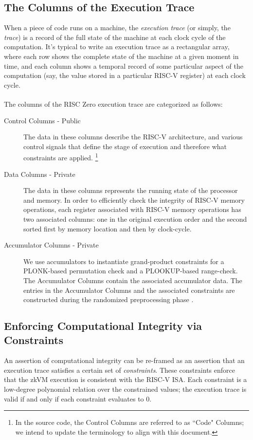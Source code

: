 \documentclass[10pt,letterpaper,titlepage]{article}
\theoremstyle{definition}
\begin{document}
\subsection{The Columns of the Execution Trace}
\label{trace}
When a piece of code runs on a machine, the \textit{execution trace} (or simply, the \textit{trace}) is a record of the full state of the machine at each clock cycle of the computation.
It's typical to write an execution trace as a rectangular array, where each row shows the complete state of the machine at a given moment in time, and each column shows a temporal record of some particular aspect of the computation (say, the value stored in a particular RISC-V register) at each clock cycle. \\
\\
The columns of the RISC Zero execution trace are categorized as follows:
\begin{description}
  \item[Control Columns - Public] The data in these columns describe the RISC-V architecture, and various control signals that define the stage of execution and therefore what constraints are applied.%
  \footnote{In the source code, the Control Columns are referred to as ``Code" Columns; we intend to update the terminology to align with this document.} 
  \item[Data Columns - Private] The data in these columns represents the running state of the processor and memory. 
  In order to efficiently check the integrity of RISC-V memory operations, each register associated with RISC-V memory operations has two associated columns: one in the original execution order and the second sorted first by memory location and then by clock-cycle. 
  \item[Accumulator Columns - Private] We use accumulators to instantiate grand-product constraints for a PLONK-based permutation check and a PLOOKUP-based range-check. 
  The Accumulator Columns contain the associated accumulator data. 
  The entries in the Accumulator Columns and the associated constraints are constructed during the randomized preprocessing phase \cite{plonk, plookup, RAP}. \\
\end{description}

\subsection{Enforcing Computational Integrity via Constraints}
An assertion of computational integrity can be re-framed as an assertion that an execution trace satisfies a certain set of \textit{constraints}.
These constraints enforce that the zkVM execution is consistent with the RISC-V ISA.
Each constraint is a low-degree polynomial relation over the constrained values; the execution trace is valid if and only if each constraint evaluates to 0.
\end{document}
